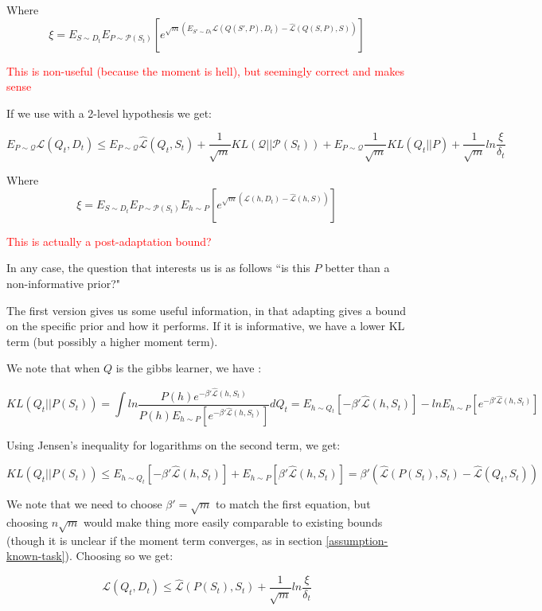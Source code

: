 \documentclass[letterpaper]{article}
\theoremstyle{definition}
\begin{document}
 Where $$\xi=E_{S\sim D_t}E_{P\sim \mathcal{P}(S_t)}\left [e^{\sqrt{m}(E_{S'\sim D_t}\mathcal{L}(Q(S', P), D_t)-\hat{\mathcal{L}}(Q(S, P), S))} \right ]$$
 
 \textcolor{red}{This is non-useful (because the moment is hell), but seemingly correct and makes sense}
 
 If we use \cite{Rivasplata2020} with a 2-level hypothesis we get:
 
 $$E_{P\sim \mathcal{Q}}\mathcal{L}(Q_t, D_t) \leq E_{P\sim \mathcal{Q}}\hat{\mathcal{L}}(Q_t, S_t) + \frac{1}{\sqrt{m}}KL(\mathcal{Q}|| \mathcal{P}(S_t)) + E_{P\sim \mathcal{Q}}\frac{1}{\sqrt{m}}KL(Q_t||P) + \frac{1}{\sqrt{m}}ln\frac{\xi}{\delta_t}$$
 
 Where $$\xi=E_{S\sim D_t}E_{P\sim \mathcal{P}(S_t)}E_{h\sim P}\left [e^{\sqrt{m}(\mathcal{L}(h, D_t)-\hat{\mathcal{L}}(h, S))} \right ]$$
 
 \textcolor{red}{This is actually a post-adaptation bound?}
 
 In any case, the question that interests us is as follows ``is this $P$ better than a non-informative prior?"
 
The first version gives us some useful information, in that adapting gives a bound on the specific prior and how it performs. If it is informative, we have a lower KL term (but possibly a higher moment term).

We note that when $Q$ is the gibbs learner, we have :

$$KL(Q_t||P(S_t))=\int ln \frac{P(h)e^{-\beta'\hat{\mathcal{L}}(h, S_t)}}{P(h)E_{h\sim P}\left [e^{-\beta'\hat{\mathcal{L}}(h, S_t)} \right ]} dQ_t=E_{h\sim Q_t}\left [-\beta'\hat{\mathcal{L}}(h, S_t) \right ]-lnE_{h\sim P}\left [e^{-\beta'\hat{\mathcal{L}}(h, S_t)} \right ]$$

Using Jensen's inequality for logarithms on the second term, we get:

$$KL(Q_t||P(S_t))\leq E_{h\sim Q_t}\left [-\beta'\hat{\mathcal{L}}(h, S_t) \right ]+E_{h\sim P}\left [\beta'\hat{\mathcal{L}}(h, S_t) \right ]=\beta'\left (\hat{\mathcal{L}}(P(S_t), S_t)-\hat{\mathcal{L}}(Q_t, S_t) \right )$$

We note that we need to choose $\beta'=\sqrt{m}$ to match the first equation, but choosing $n\sqrt{m}$ would make thing more easily comparable to existing bounds (though it is unclear if the moment term converges, as in section \ref{assumption-known-task}). Choosing so we get: 

$$\mathcal{L}(Q_t, D_t) \leq \hat{\mathcal{L}}(P(S_t), S_t) + \frac{1}{\sqrt{m}}ln\frac{\xi}{\delta_t}$$
\end{document}
